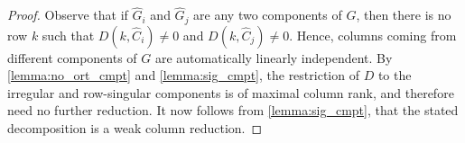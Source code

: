 \documentclass{article}
\theoremstyle{definition}
\begin{document}
\begin{proof}
Observe that if $\widehat{G}_i$ and $\widehat{G}_j$ are any two components of $G$, then there is no row $k$ such that $D(k, \widehat{C}_i) \neq 0$ and $D(k, \widehat{C}_j) \neq 0$. Hence, columns coming from different components of $G$ are automatically linearly independent. By \cref{lemma:no_ort_cmpt} and \cref{lemma:sig_cmpt}, the restriction of $D$ to the irregular and row-singular components is of maximal column rank, and therefore need no further reduction. It now follows from \cref{lemma:sig_cmpt}, that the stated decomposition is a weak column reduction.

\end{proof}
\end{document}

